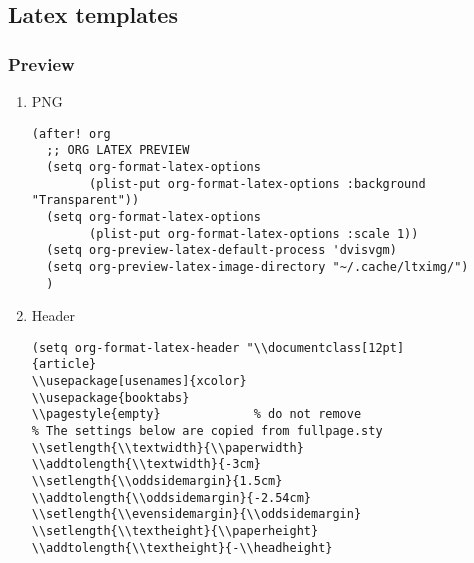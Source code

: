 \documentclass[c]{article}
\theoremstyle{plain}%
\theoremstyle{definition}
\theoremstyle{remark}
\begin{document}
\subsection{Latex templates}
\label{sec:orgfa81f66}
\subsubsection{Preview}
\label{sec:org4081326}
\begin{enumerate}
\item PNG
\label{sec:org0059762}
\begin{verbatim}
(after! org
  ;; ORG LATEX PREVIEW
  (setq org-format-latex-options
        (plist-put org-format-latex-options :background "Transparent"))
  (setq org-format-latex-options
        (plist-put org-format-latex-options :scale 1))
  (setq org-preview-latex-default-process 'dvisvgm)
  (setq org-preview-latex-image-directory "~/.cache/ltximg/")
  )
\end{verbatim}
\item Header
\label{sec:org69d02d2}
\begin{verbatim}
(setq org-format-latex-header "\\documentclass[12pt]
{article}
\\usepackage[usenames]{xcolor}
\\usepackage{booktabs}
\\pagestyle{empty}             % do not remove
% The settings below are copied from fullpage.sty
\\setlength{\\textwidth}{\\paperwidth}
\\addtolength{\\textwidth}{-3cm}
\\setlength{\\oddsidemargin}{1.5cm}
\\addtolength{\\oddsidemargin}{-2.54cm}
\\setlength{\\evensidemargin}{\\oddsidemargin}
\\setlength{\\textheight}{\\paperheight}
\\addtolength{\\textheight}{-\\headheight}

\end{verbatim}
\end{enumerate}
\end{document}
